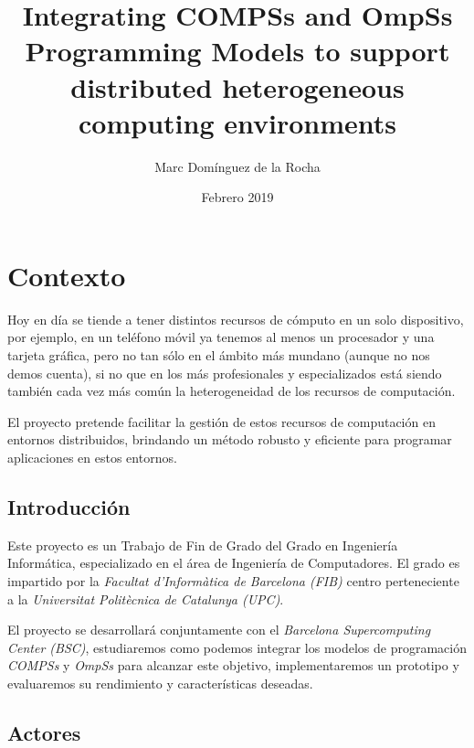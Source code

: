 \documentclass[a4paper]{article}
\title{Integrating COMPSs and OmpSs Programming Models to support distributed heterogeneous computing environments}
\author{Marc Domínguez de la Rocha}
\date{Febrero 2019}
\begin{document}
\maketitle

\newpage
\renewcommand{\contentsname}{Índice}
\tableofcontents
\newpage


\section{Contexto}

Hoy en día se tiende a tener distintos recursos de cómputo en un solo dispositivo, por ejemplo, en un teléfono móvil ya tenemos al menos un procesador y una tarjeta gráfica, pero no tan sólo en el ámbito más mundano (aunque no nos demos cuenta), si no que en los más profesionales y especializados está siendo también cada vez más común la heterogeneidad de los recursos de computación. 
\par\bigskip

El proyecto pretende facilitar la gestión de estos recursos de computación en entornos distribuidos, brindando un método robusto y eficiente para programar aplicaciones en estos entornos.


\subsection{Introducción}

Este proyecto es un Trabajo de Fin de Grado del Grado en Ingeniería Informática, especializado en el área de Ingeniería de Computadores. El grado es impartido por la \textit{Facultat d'Informàtica de Barcelona (FIB)} centro perteneciente a la \textit{Universitat Politècnica de Catalunya (UPC)}. 
\par\bigskip

El proyecto se desarrollará conjuntamente con el \textit{Barcelona Supercomputing Center (BSC)}, estudiaremos como podemos integrar los modelos de programación \textit{COMPSs} y \textit{OmpSs} para alcanzar este objetivo, implementaremos un prototipo y evaluaremos su rendimiento y características deseadas. 

\subsection{Actores}
\end{document}
